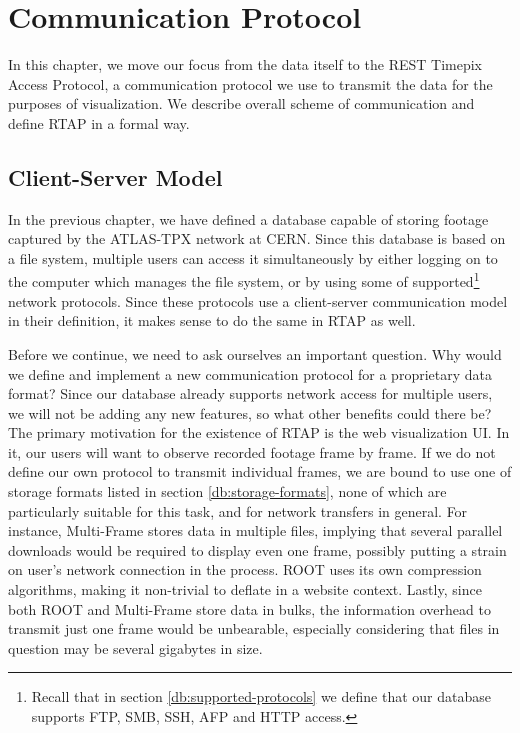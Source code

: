 \chapter{Communication Protocol}

In this chapter, we move our focus from the data itself to the REST Timepix Access Protocol, a communication protocol we use to transmit the data for the purposes of visualization. We describe overall scheme of communication and define RTAP in a formal way.

\section{Client-Server Model}
In the previous chapter, we have defined a database capable of storing footage captured by the ATLAS-TPX network at CERN. Since this database is based on a file system, multiple users can access it simultaneously by either logging on to the computer which manages the file system, or by using some of supported\footnote{Recall that in section \ref{db:supported-protocols} we define that our database supports FTP, SMB, SSH, AFP and HTTP access.} network protocols. Since these protocols use a client-server communication model in their definition, it makes sense to do the same in RTAP as well.

Before we continue, we need to ask ourselves an important question. Why would we define and implement a new communication protocol for a proprietary data format? Since our database already supports network access for multiple users, we will not be adding any new features, so what other benefits could there be? The primary motivation for the existence of RTAP is the web visualization UI. In it, our users will want to observe recorded footage frame by frame. If we do not define our own protocol to transmit individual frames, we are bound to use one of storage formats listed in section \ref{db:storage-formats}, none of which are particularly suitable for this task, and for network transfers in general. For instance, Multi-Frame stores data in multiple files, implying that several parallel downloads would be required to display even one frame, possibly putting a strain on user's network connection in the process. ROOT uses its own compression algorithms, making it non-trivial to deflate in a website context. Lastly, since both ROOT and Multi-Frame store data in bulks, the information overhead to transmit just one frame would be unbearable, especially considering that files in question may be several gigabytes in size.

